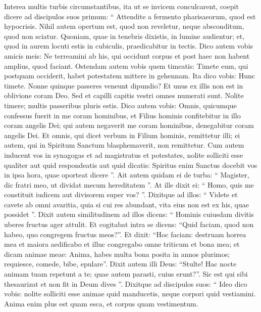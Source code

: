 \begin{biblechapter}
\begin{biblechapter}
\begin{biblechapter}
\begin{biblechapter}
\begin{biblechapter}
\begin{biblechapter}
\begin{biblechapter}
\begin{biblechapter}
\begin{biblechapter}
\begin{biblechapter}
\begin{biblechapter}
\begin{biblechapter}
\verse Interea multis turbis circumstantibus, ita ut se invicem conculcarent, coepit dicere ad discipulos suos primum: “ Attendite a fermento pharisaeorum, quod est hypocrisis. 
\verse Nihil autem opertum est, quod non reveletur, neque absconditum, quod non sciatur. 
\verse Quoniam, quae in tenebris dixistis, in lumine audientur; et, quod in aurem locuti estis in cubiculis, praedicabitur in tectis.
 \verse Dico autem vobis amicis meis: Ne terreamini ab his, qui occidunt corpus et post haec non habent amplius, quod faciant. 
\verse Ostendam autem vobis quem timeatis: Timete eum, qui postquam occiderit, habet potestatem mittere in gehennam. Ita dico vobis: Hunc timete. 
\verse Nonne quinque passeres veneunt dipundio? Et unus ex illis non est in oblivione coram Deo. 
\verse Sed et capilli capitis vestri omnes numerati sunt. Nolite timere; multis passeribus pluris estis.
 \verse Dico autem vobis: Omnis, quicumque confessus fuerit in me coram hominibus, et Filius hominis confitebitur in illo coram angelis Dei; 
\verse qui autem negaverit me coram hominibus, denegabitur coram angelis Dei.
 \verse Et omnis, qui dicet verbum in Filium hominis, remittetur illi; ei autem, qui in Spiritum Sanctum blasphemaverit, non remittetur.
 \verse Cum autem inducent vos in synagogas et ad magistratus et potestates, nolite solliciti esse qualiter aut quid respondeatis aut quid dicatis: 
\verse Spiritus enim Sanctus docebit vos in ipsa hora, quae oporteat dicere ”.
 \verse Ait autem quidam ei de turba: “ Magister, dic fratri meo, ut dividat mecum hereditatem ”. 
\verse At ille dixit ei: “ Homo, quis me constituit iudicem aut divisorem super vos? ”. 
\verse Dixitque ad illos: “ Videte et cavete ab omni avaritia, quia si cui res abundant, vita eius non est ex his, quae possidet ”. 
\verse Dixit autem similitudinem ad illos dicens: “ Hominis cuiusdam divitis uberes fructus ager attulit. 
\verse Et cogitabat intra se dicens: “Quid faciam, quod non habeo, quo congregem fructus meos?”. 
\verse Et dixit: “Hoc faciam: destruam horrea mea et maiora aedificabo et illuc congregabo omne triticum et bona mea; 
\verse et dicam animae meae: Anima, habes multa bona posita in annos plurimos; requiesce, comede, bibe, epulare”. 
\verse Dixit autem illi Deus: “Stulte! Hac nocte animam tuam repetunt a te; quae autem parasti, cuius erunt?”. 
 \verse Sic est qui sibi thesaurizat et non fit in Deum dives ”.
 \verse Dixitque ad discipulos suos: “ Ideo dico vobis: nolite solliciti esse animae quid manducetis, neque corpori quid vestiamini.
 \verse Anima enim plus est quam esca, et corpus quam vestimentum. 

\end{biblechapter}
\end{biblechapter}
\end{biblechapter}
\end{biblechapter}
\end{biblechapter}
\end{biblechapter}
\end{biblechapter}
\end{biblechapter}
\end{biblechapter}
\end{biblechapter}
\end{biblechapter}
\end{biblechapter}
